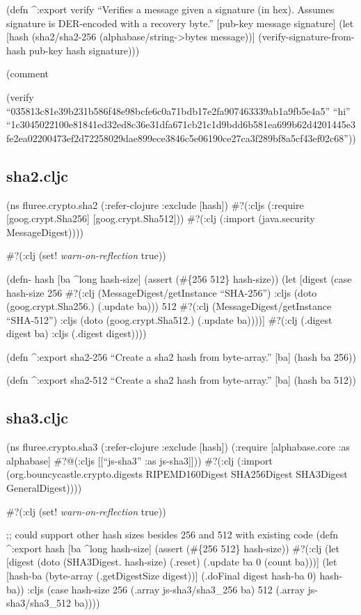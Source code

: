 \documentclass[
]{article}
\begin{document}
(defn \^{}:export verify ``Verifies a message given a signature (in
hex). Assumes signature is DER-encoded with a recovery byte.''
{[}pub-key message signature{]} (let {[}hash (sha2/sha2-256
(alphabase/string-\textgreater bytes message)){]}
(verify-signature-from-hash pub-key hash signature)))

(comment

(verify
``035813c81e39b231b586f48e98bcfe6c0a71bdb17e2fa907463339ab1a9fb5e4a5''
``hi''
``1c3045022100e81841ed32ed8c36e31dfa671cb21c1d9bdd6b581ea699b62d4201445e3fe2ea02200473ef2d72258029dae899ece3846c5e06190ce27ca3f289bf8a5cf43ef02c68''))

\subsection{sha2.cljc}\label{sha2.cljc}

(ns fluree.crypto.sha2 (:refer-clojure :exclude {[}hash{]}) \#?(:cljs
(:require {[}goog.crypt.Sha256{]} {[}goog.crypt.Sha512{]})) \#?(:clj
(:import (java.security MessageDigest))))

\#?(:clj (set! \emph{warn-on-reflection} true))

(defn- hash {[}ba \^{}long hash-size{]} (assert (\#\{256 512\}
hash-size)) (let {[}digest (case hash-size 256 \#?(:clj
(MessageDigest/getInstance ``SHA-256'') :cljs (doto (goog.crypt.Sha256.)
(.update ba))) 512 \#?(:clj (MessageDigest/getInstance ``SHA-512'')
:cljs (doto (goog.crypt.Sha512.) (.update ba)))){]} \#?(:clj (.digest
digest ba) :cljs (.digest digest))))

(defn \^{}:export sha2-256 ``Create a sha2 hash from byte-array.''
{[}ba{]} (hash ba 256))

(defn \^{}:export sha2-512 ``Create a sha2 hash from byte-array.''
{[}ba{]} (hash ba 512))

\subsection{sha3.cljc}\label{sha3.cljc}

(ns fluree.crypto.sha3 (:refer-clojure :exclude {[}hash{]}) (:require
{[}alphabase.core :as alphabase{]} \#?@(:cljs {[}{[}``js-sha3'' :as
js-sha3{]}{]})) \#?(:clj (:import (org.bouncycastle.crypto.digests
RIPEMD160Digest SHA256Digest SHA3Digest GeneralDigest))))

\#?(:clj (set! \emph{warn-on-reflection} true))

;; could support other hash sizes besides 256 and 512 with existing code
(defn \^{}:export hash {[}ba \^{}long hash-size{]} (assert (\#\{256
512\} hash-size)) \#?(:clj (let {[}digest (doto (SHA3Digest. hash-size)
(.reset) (.update ba 0 (count ba))){]} (let {[}hash-ba (byte-array
(.getDigestSize digest)){]} (.doFinal digest hash-ba 0) hash-ba)) :cljs
(case hash-size 256 (.array js-sha3/sha3\_256 ba) 512 (.array
js-sha3/sha3\_512 ba))))
\end{document}
